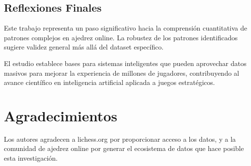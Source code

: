 \documentclass[11pt,a4paper]{article}
\begin{document}
\subsection{Reflexiones Finales}

Este trabajo representa un paso significativo hacia la comprensi\'on cuantitativa de patrones complejos en ajedrez online. La robustez de los patrones identificados sugiere validez general m\'as all\'a del dataset espec\'ifico.

El estudio establece bases para sistemas inteligentes que pueden aprovechar datos masivos para mejorar la experiencia de millones de jugadores, contribuyendo al avance cient\'ifico en inteligencia artificial aplicada a juegos estrat\'egicos.

\section*{Agradecimientos}

Los autores agradecen a lichess.org por proporcionar acceso a los datos, y a la comunidad de ajedrez online por generar el ecosistema de datos que hace posible esta investigaci\'on.
\end{document}
